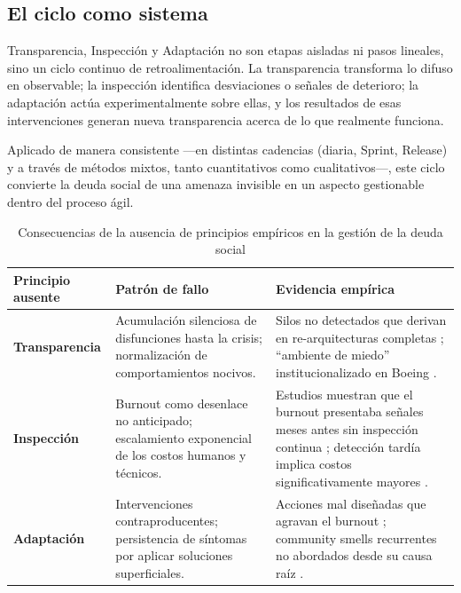 \FloatBarrier

\subsection{El ciclo como sistema}

Transparencia, Inspección y Adaptación no son etapas aisladas ni pasos lineales, sino un ciclo continuo de retroalimentación.
La transparencia transforma lo difuso en observable; la inspección identifica desviaciones o señales de deterioro; la adaptación actúa experimentalmente sobre ellas, y los resultados de esas intervenciones generan nueva transparencia acerca de lo que realmente funciona.

Aplicado de manera consistente —en distintas cadencias (diaria, Sprint, Release) y a través de métodos mixtos, tanto cuantitativos como cualitativos—, este ciclo convierte la deuda social de una amenaza invisible en un aspecto gestionable dentro del proceso ágil.

\begin{table}[!htbp]
    \caption{Consecuencias de la ausencia de principios empíricos en la gestión de la deuda social}
    \label{tab:consecuencias_ausencia}
    \centering
    \small
    \begin{tabular}{@{}p{3cm}p{5.5cm}p{5cm}@{}}
        \toprule
        \textbf{Principio ausente}                                                                        & \textbf{Patrón de fallo} & \textbf{Evidencia empírica}                                                 \\
        \midrule
        \textbf{Transparencia}                                                                            &
        Acumulación silenciosa de disfunciones hasta la crisis; normalización de comportamientos nocivos. &
        Silos no detectados que derivan en re-arquitecturas completas \cite{tamburri2015insights}; ``ambiente de miedo'' institucionalizado en Boeing \cite{saeeda2024nontechnicaldebt}.                           \\
        \addlinespace
        \textbf{Inspección}                                                                               &
        Burnout como desenlace no anticipado; escalamiento exponencial de los costos humanos y técnicos.  &
        Estudios muestran que el burnout presentaba señales meses antes sin inspección continua \cite{tulili2022burnout}; detección tardía implica costos significativamente mayores \cite{dreesen2021socialdebt}. \\
        \addlinespace

        \textbf{Adaptación}                                                                               &
        Intervenciones contraproducentes; persistencia de síntomas por aplicar soluciones superficiales.  &
        Acciones mal diseñadas que agravan el burnout \cite{martini2019agiledebt}; community smells recurrentes no abordados desde su causa raíz \cite{caballero2022communitysmells}.                              \\
        \bottomrule
    \end{tabular}
\end{table}

